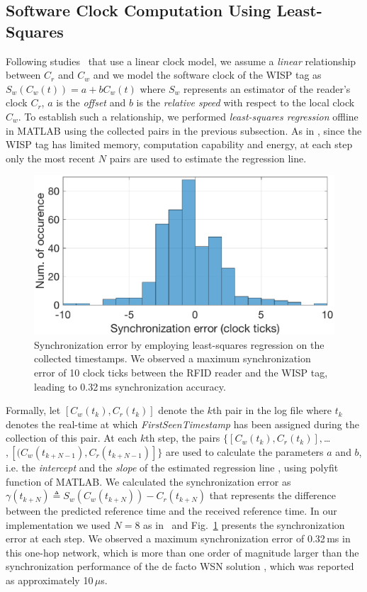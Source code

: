 \documentclass[10pt,journal,compsoc]{IEEEtran}
\begin{document}
\subsection{Software Clock Computation Using  Least-Squares}

Following studies~\cite{Maroti2004,Schmid:2010,Lenzen:2015,TATS:2016} that use a linear clock model, we assume a \emph{linear} relationship between $C_r$ and $C_w$ and we model the software clock of the WISP tag as $S_w(C_w(t)) = a + b C_w(t)$ where $S_w$ represents an estimator of the reader's clock $C_r$, $a$ is the \emph{offset} and $b$ is the \emph{relative speed} with respect to the local clock $C_w$. To establish such a relationship, we performed \emph{least-squares regression} offline in MATLAB using the collected pairs in the previous subsection. As in \cite{Maroti2004}, since the WISP tag has limited memory, computation capability and energy, at each step only the most recent $N$ pairs are used to estimate the regression line. 

\begin{figure}
	\centering
	\includegraphics[width=0.9\columnwidth]{figures/least_squares.eps}
	\caption{\label{fig:least-squares}Synchronization error by employing least-squares regression on the collected timestamps. We observed a maximum synchronization error of 10 clock ticks between the RFID reader and the WISP tag, leading to 0.32\,ms synchronization accuracy.}
\end{figure}

Formally, let $[C_w(t_k),C_r(t_k)]$ denote the $k$th pair in the log file where $t_k$ denotes the real-time at which 
\emph{FirstSeenTimestamp} has been assigned during the collection of this pair. At each $k$th step, the pairs $\{[C_w(t_k),C_r(t_k)],$\ldots$,[(C_w(t_{k+N-1}),C_r(t_{k+N-1})]\}$ are used to calculate the parameters $a$ and $b$, i.e. the \emph{intercept} and the \emph{slope} of the estimated regression line \cite{book-SheldonRoss}, using \textsf{polyfit} function of MATLAB. We calculated the synchronization error as 
$\gamma(t_{k+N})\triangleq S_w(C_w(t_{k+N}))-C_r(t_{k+N})$
%
that represents the difference between the predicted reference time and the received reference time. In our implementation we used $N=8$ as in~\cite{Maroti2004} and Fig.~\ref{fig:least-squares} presents the synchronization error at each step. We observed a maximum synchronization error of 0.32\,ms in this one-hop network, which is more than one order of magnitude larger than the synchronization performance of the de facto WSN solution \cite{Maroti2004}, which was reported as approximately 10\,$\mu$s.
\end{document}

